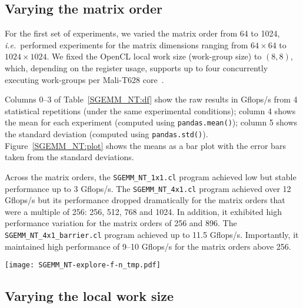 \documentclass{acm_proc_article-sp} %
\begin{document}
\subsection{Varying the matrix order}
\label{sec:order}

For the first set of experiments, we varied the matrix order from 64 to 1024,
{\em i.e.}\ performed experiments for the matrix dimensions ranging from $64
\times 64$ to $1024 \times 1024$.
%
We fixed the OpenCL local work size (work-group size) to $(8,8)$, which,
depending on the register usage, supports up to four concurrently executing
work-groups per Mali-T628 core~\cite{Gronqvist:2014}.

Columns 0--3 of Table~\ref{SGEMM_NT:df} show the raw results in Gflops/s from 4
statistical repetitions (under the same experimental conditions); column 4
shows the mean for each experiment (computed using {\tt pandas.mean()}); column
5 shows the standard deviation (computed using {\tt pandas.std()}).
%
Figure~\ref{SGEMM_NT:plot} shows the means as a bar plot with the error bars
taken from the standard deviations.

Across the matrix orders, the \verb|SGEMM_NT_1x1.cl| program achieved
low but stable performance up to 3 Gflops/s.
%
The \verb|SGEMM_NT_4x1.cl| program achieved over 12 Gflops/s but its
performance dropped dramatically for the matrix orders that were a multiple of
256: 256, 512, 768 and 1024.
%
In addition, it exhibited high performance variation for the matrix orders of
256 and 896.
%
The \verb|SGEMM_NT_4x1_barrier.cl| program achieved up to 11.5
Gflops/s. Importantly, it maintained high performance of 9--10 Gflops/s
for the matrix orders above 256.


\begin{table*}
  \centering
  \caption{\label{SGEMM_NT:df}The performance of 3 SGEMM NT kernels.}
  
\end{table*}

\begin{figure*}
  \texttt{[image: SGEMM\_NT-explore-f-n\_tmp.pdf]}
  \caption{The performance of 3 SGEMM NT kernels.}
  \label{SGEMM_NT:plot}
\end{figure*}


\subsection{Varying the local work size}
\label{sec:lws}
\end{document}
